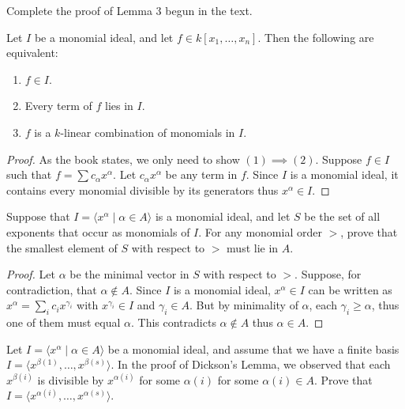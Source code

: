 \begin{tcolorbox}[title=Problem 2, breakable]
    Complete the proof of Lemma 3 begun in the text.
\end{tcolorbox}

\begin{theorem}
    Let $I$ be a monomial ideal, and let $f \in k[x_1, \ldots, x_n]$.
    Then the following are equivalent:
    \begin{enumerate}
        \item $f \in I$.
        \item Every term of $f$ lies in $I$.
        \item $f$ is a $k$-linear combination of monomials in $I$.
    \end{enumerate}
\end{theorem}

\begin{proof}
    As the book states, we only need to show $(1) \implies (2)$.
    Suppose $f \in I$ such that $f = \sum c_\alpha x^\alpha$.
    Let $c_\alpha x^\alpha$ be any term in $f$. 
    Since $I$ is a monomial ideal, it contains every monomial divisible by its generators
        thus $x^\alpha \in I$. 
\end{proof}


\begin{tcolorbox}[title=Problem 5, breakable]
    Suppose that $I = \langle x^\alpha \mid \alpha \in A \rangle$
    is a monomial ideal, and let $S$ be the set of all exponents 
    that occur as monomials of $I$. For any monomial order $>$,
    prove that the smallest element of $S$ with respect to $>$
    must lie in $A$.
\end{tcolorbox}

\begin{proof}
    Let $\alpha$ be the minimal vector in $S$ with respect to $>$.
    Suppose, for contradiction, that $\alpha \notin A$.
    Since $I$ is a monomial ideal, $x^\alpha \in I$ can be written as
    $x^\alpha = \sum_i c_i x^{\gamma_i}$ with $x^{\gamma_i} \in I$ and $\gamma_i \in A$.
    But by minimality of $\alpha$, each $\gamma_i \ge \alpha$, thus one of them must equal $\alpha$.
    This contradicts $\alpha \notin A$ thus $\alpha \in A$.
\end{proof}

\begin{tcolorbox}[title=Problem 6, breakable]
    Let $I = \langle x^\alpha \mid \alpha \in A \rangle$ be a monomial ideal,
    and assume that we have a finite basis
    $I = \langle x^{\beta(1)}, \ldots, x^{\beta(s)} \rangle$.
    In the proof of Dickson's Lemma, we observed that each 
    $x^{\beta(i)}$ is divisible by $x^{\alpha(i)}$ for some 
    $\alpha(i)$ for some $\alpha(i) \in A$. Prove that 
    $I = \langle x^{\alpha(i)}, \ldots, x^{\alpha(s)} \rangle$.
\end{tcolorbox}


